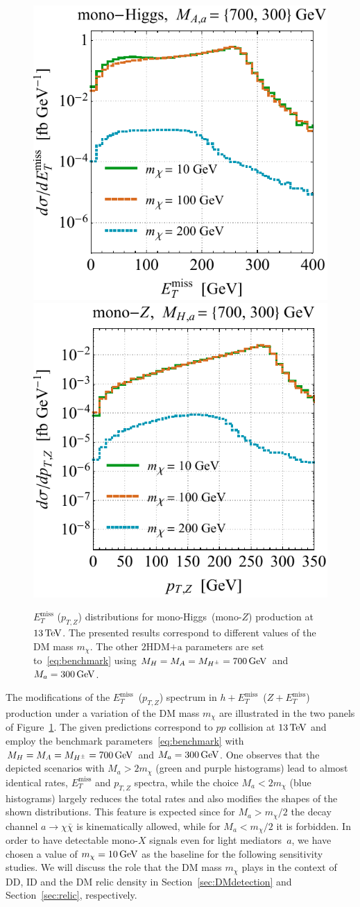 \documentclass[a4paper, 11pt,notoc]{article}
\newcommand{\MET}{\ensuremath{E_T^\mathrm{miss}}\xspace}
\newcommand{\mA}{\ensuremath{M_{A}}\xspace}
\newcommand{\ma}{\ensuremath{M_{a}}\xspace}
\newcommand{\mH}{\ensuremath{M_{H}}\xspace}
\newcommand{\mHc}{\ensuremath{M_{H^{\pm}}}\xspace}
\newcommand{\hdma}{\ensuremath{\textrm{2HDM+a}}\xspace}
\begin{document}
\begin{figure}[t!]
\centering
\includegraphics[height=0.45\textwidth]{mdml.pdf} \qquad 
\includegraphics[height=0.45\textwidth]{mdmr.pdf}
\vspace{2mm}
\caption{\label{fig:mdmvar} $\MET$ ($p_{T,Z}$) distributions for mono-Higgs~(mono-$Z$) production at $13 \, {\rm TeV}$. The presented results correspond to different values of the DM mass $m_\chi$. The other \hdma parameters are set to~\eqref{eq:benchmark} using $\mH = \mA = \mHc = 700 \, {\rm GeV}$ and $\ma = 300 \, {\rm GeV}$. }
\end{figure}

The modifications of the $\MET$~($p_{T,Z}$) spectrum in $h+\MET$~($Z+\MET$) production under a variation of the DM mass $m_\chi$ are illustrated in the two panels of Figure~\ref{fig:mdmvar}. The given predictions correspond to $pp$ collision at $13 \, {\rm TeV}$ and employ the benchmark parameters~\eqref{eq:benchmark} with $\mH = \mA = \mHc = 700 \, {\rm GeV}$ and $\ma = 300 \, {\rm GeV}$. One observes that the depicted scenarios with $\ma  > 2 m_\chi$ (green and purple histograms) lead to almost identical rates, $\MET$ and $p_{T,Z}$ spectra, while the choice $\ma  < 2 m_\chi$ (blue histograms) 
largely reduces the total rates and also modifies the shapes of the shown distributions. This feature is expected since for $\ma > m_\chi/2$ the decay channel $a \to \chi \bar \chi$ is kinematically allowed, while for $\ma < m_\chi/2$ it is forbidden. In order to have detectable mono-$X$ signals even for light mediators~$a$, we have chosen a value of  $m_\chi = 10 \, {\rm GeV}$ as the baseline for the following sensitivity studies.  We will discuss the role that the DM mass $m_\chi$ plays in the context of DD, ID and the DM relic density in Section~\ref{sec:DMdetection}  and Section~\ref{sec:relic}, respectively. 
\end{document}
